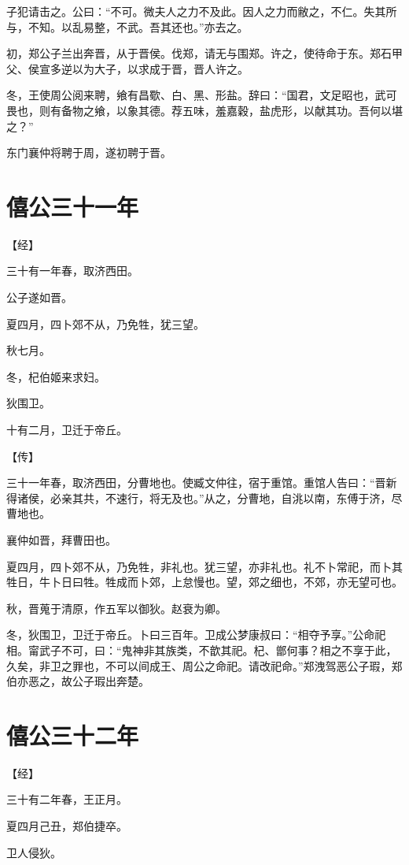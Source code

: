 \documentclass[a4paper,12pt,UTF8,twoside]{ctexbook}
\begin{document}
子犯请击之。公曰：“不可。微夫人之力不及此。因人之力而敝之，不仁。失其所与，不知。以乱易整，不武。吾其还也。”亦去之。

初，郑公子兰出奔晋，从于晋侯。伐郑，请无与围郑。许之，使待命于东。郑石甲父、侯宣多逆以为大子，以求成于晋，晋人许之。

冬，王使周公阅来聘，飨有昌歜、白、黑、形盐。辞曰：“国君，文足昭也，武可畏也，则有备物之飨，以象其德。荐五味，羞嘉穀，盐虎形，以献其功。吾何以堪之？”

东门襄仲将聘于周，遂初聘于晋。

\chapter{僖公三十一年}


【经】

三十有一年春，取济西田。

公子遂如晋。

夏四月，四卜郊不从，乃免牲，犹三望。

秋七月。

冬，杞伯姬来求妇。

狄围卫。

十有二月，卫迁于帝丘。

【传】

三十一年春，取济西田，分曹地也。使臧文仲往，宿于重馆。重馆人告曰：“晋新得诸侯，必亲其共，不速行，将无及也。”从之，分曹地，自洮以南，东傅于济，尽曹地也。

襄仲如晋，拜曹田也。

夏四月，四卜郊不从，乃免牲，非礼也。犹三望，亦非礼也。礼不卜常祀，而卜其牲日，牛卜日曰牲。牲成而卜郊，上怠慢也。望，郊之细也，不郊，亦无望可也。

秋，晋蒐于清原，作五军以御狄。赵衰为卿。

冬，狄围卫，卫迁于帝丘。卜曰三百年。卫成公梦康叔曰：“相夺予享。”公命祀相。甯武子不可，曰：“鬼神非其族类，不歆其祀。杞、鄫何事？相之不享于此，久矣，非卫之罪也，不可以间成王、周公之命祀。请改祀命。”郑洩驾恶公子瑕，郑伯亦恶之，故公子瑕出奔楚。


\chapter{僖公三十二年}




【经】

三十有二年春，王正月。

夏四月己丑，郑伯捷卒。

卫人侵狄。
\end{document}
